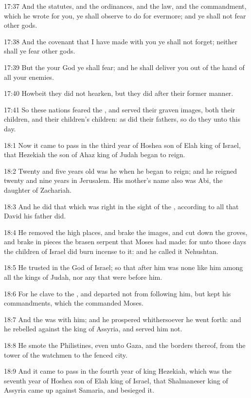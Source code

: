 17:37 And the statutes, and the ordinances, and the law, and the commandment, which he wrote for you, ye shall observe to do for evermore; and ye shall not fear other gods.

17:38 And the covenant that I have made with you ye shall not forget; neither shall ye fear other gods.

17:39 But the \LORD your God ye shall fear; and he shall deliver you out of the hand of all your enemies.

17:40 Howbeit they did not hearken, but they did after their former manner.

17:41 So these nations feared the \LORD, and served their graven images, both their children, and their children's children: as did their fathers, so do they unto this day.

18:1 Now it came to pass in the third year of Hoshea son of Elah king of Israel, that Hezekiah the son of Ahaz king of Judah began to reign.

18:2 Twenty and five years old was he when he began to reign; and he reigned twenty and nine years in Jerusalem. His mother's name also was Abi, the daughter of Zachariah.

18:3 And he did that which was right in the sight of the \LORD, according to all that David his father did.

18:4 He removed the high places, and brake the images, and cut down the groves, and brake in pieces the brasen serpent that Moses had made: for unto those days the children of Israel did burn incense to it: and he called it Nehushtan.

18:5 He trusted in the \LORD God of Israel; so that after him was none like him among all the kings of Judah, nor any that were before him.

18:6 For he clave to the \LORD, and departed not from following him, but kept his commandments, which the \LORD commanded Moses.

18:7 And the \LORD was with him; and he prospered whithersoever he went forth: and he rebelled against the king of Assyria, and served him not.

18:8 He smote the Philistines, even unto Gaza, and the borders thereof, from the tower of the watchmen to the fenced city.

18:9 And it came to pass in the fourth year of king Hezekiah, which was the seventh year of Hoshea son of Elah king of Israel, that Shalmaneser king of Assyria came up against Samaria, and besieged it.

